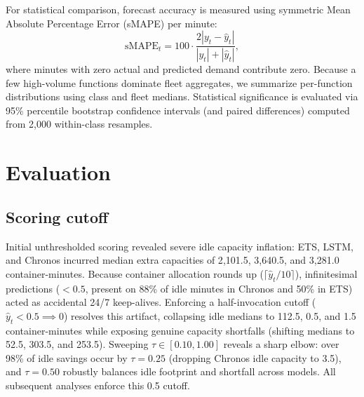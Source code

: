 \documentclass[conference,a4paper]{IEEEtran}
\begin{document}
For statistical comparison, forecast accuracy is measured using symmetric Mean Absolute Percentage Error (sMAPE) per minute:
\begin{equation}
\mathrm{sMAPE}_t = 100 \cdot \frac{2|y_t - \hat{y}_t|}{|y_t| + |\hat{y}_t|},
\label{eq:smape}
\end{equation}
where minutes with zero actual and predicted demand contribute zero. Because a few high-volume functions dominate fleet aggregates, we summarize per-function distributions using class and fleet medians. Statistical significance is evaluated via 95\% percentile bootstrap confidence intervals (and paired differences) computed from 2,000 within-class resamples.

\section{Evaluation}
\label{sec:evaluation}
\subsection{Scoring cutoff}
Initial unthresholded scoring revealed severe idle capacity inflation: ETS, LSTM, and Chronos incurred median extra capacities of 2{,}101.5, 3{,}640.5, and 3{,}281.0 container-minutes. Because container allocation rounds up ($\lceil \hat{y}_t / 10 \rceil$), infinitesimal predictions ($<0.5$, present on 88\% of idle minutes in Chronos and 50\% in ETS) acted as accidental 24/7 keep-alives. Enforcing a half-invocation cutoff ($\hat{y}_t < 0.5 \implies 0$) resolves this artifact, collapsing idle medians to 112.5, 0.5, and 1.5 container-minutes while exposing genuine capacity shortfalls (shifting medians to 52.5, 303.5, and 253.5). Sweeping $\tau \in [0.10, 1.00]$ reveals a sharp elbow: over 98\% of idle savings occur by $\tau = 0.25$ (dropping Chronos idle capacity to 3.5), and $\tau = 0.50$ robustly balances idle footprint and shortfall across models. All subsequent analyses enforce this 0.5 cutoff.
\end{document}
